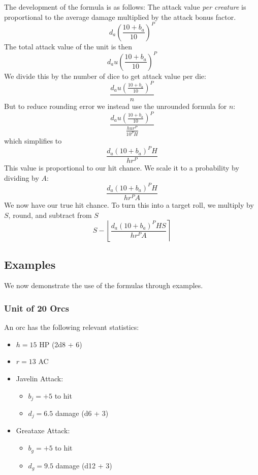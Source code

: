 \documentclass[twocolumn]{article}
\begin{document}
The development of the formula is as follows:
The attack value \emph{per creature} is proportional to
the average damage multiplied by the attack bonus factor.
\[
    d_a \left(\frac{10 + b_{a}}{10}\right)^{P}
\]
The total attack value of the unit is then 
\[
    d_a u \left(\frac{10 + b_{a}}{10}\right)^{P}
\]
We divide this by the number of dice to get attack value per die: 
\[
    \frac
        {d_a u \left(\frac{10 + b_{a}}{10}\right)^{P}}
        {n}
\]
But to reduce rounding error we instead use the unrounded formula for $n$: 
\[
    \frac
        {d_a u \left(\frac{10 + b_{a}}{10}\right)^{P}}
        {\frac{h u r^P}{10^P H}}
\]
which simplifies to 
\[
    \frac
        {d_a (10 + b_{a})^P H}
        {h r^P}
\]
This value is proportional to our hit chance.
We scale it to a probability by dividing by $A$:
\[
    \frac
        {d_a (10 + b_{a})^P H}
        {h r^P A}
\]
We now have our true hit chance.
To turn this into a target roll,
we multiply by $S$, round, and subtract from $S$
\[
    S -
    \left\lfloor
        \frac
            {d_a (10 + b_{a})^P H S}
            {h r^P A}
    \right\rceil
\]

\subsection{Examples}\label{sec:examples}

We now demonstrate the use of the formulas through examples.

\subsubsection{Unit of 20 Orcs}

An orc has the following relevant statistics:
\begin{itemize}
    \item $h = 15$ HP (2d8 + 6)
    \item $r = 13$ AC
    \item Javelin Attack:
        \begin{itemize}
            \item $b_j = +5$ to hit
            \item $d_j = 6.5$ damage (d6 + 3)
        \end{itemize}
    \item Greataxe Attack:
        \begin{itemize}
            \item $b_g = +5$ to hit
            \item $d_g = 9.5$ damage (d12 + 3)
        \end{itemize}
\end{itemize}
\end{document}
